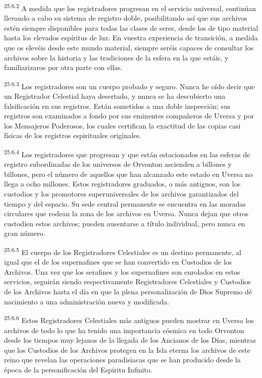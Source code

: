 \par
\textsuperscript{25:6.2} A medida que los registradores progresan en el servicio universal, continúan llevando a cabo su sistema de registro doble, posibilitando así que sus archivos estén siempre disponibles para todas las clases de seres, desde los de tipo material hasta los elevados espíritus de luz. En vuestra experiencia de transición, a medida que os elevéis desde este mundo material, siempre seréis capaces de consultar los archivos sobre la historia y las tradiciones de la esfera en la que estáis, y familiarizaros por otra parte con ellas.

\par
\textsuperscript{25:6.3} Los registradores son un cuerpo probado y seguro. Nunca he oído decir que un Registrador Celestial haya desertado, y nunca se ha descubierto una falsificación en sus registros. Están sometidos a una doble inspección; sus registros son examinados a fondo por sus eminentes compañeros de Uversa y por los Mensajeros Poderosos, los cuales certifican la exactitud de las copias casi físicas de los registros espirituales originales.

\par
\textsuperscript{25:6.4} Los registradores que progresan y que están estacionados en las esferas de registro subordinadas de los universos de Orvonton ascienden a billones y billones, pero el número de aquellos que han alcanzado este estado en Uversa no llega a ocho millones. Estos registradores graduados, o más antiguos, son los custodios y los promotores superuniversales de los archivos garantizados del tiempo y del espacio. Su sede central permanente se encuentra en las moradas circulares que rodean la zona de los archivos en Uversa. Nunca dejan que otros custodien estos archivos; pueden ausentarse a título individual, pero nunca en gran número.

\par
\textsuperscript{25:6.5} El cuerpo de los Registradores Celestiales es un destino permanente, al igual que el de los supernafines que se han convertido en Custodios de los Archivos. Una vez que los serafines y los supernafines son enrolados en estos servicios, seguirán siendo respectivamente Registradores Celestiales y Custodios de los Archivos hasta el día en que la plena personalización de Dios Supremo dé nacimiento a una administración nueva y modificada.

\par
\textsuperscript{25:6.6} Estos Registradores Celestiales más antiguos pueden mostrar en Uversa los archivos de todo lo que ha tenido una importancia cósmica en todo Orvonton desde los tiempos muy lejanos de la llegada de los Ancianos de los Días, mientras que los Custodios de los Archivos protegen en la Isla eterna los archivos de este reino que revelan las operaciones paradisiacas que se han producido desde la época de la personificación del Espíritu Infinito.

